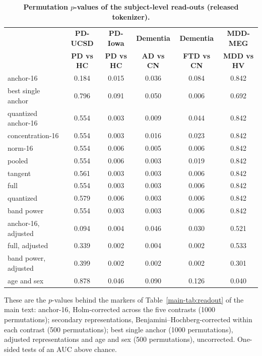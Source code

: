\begin{table}[!ht]
\renewcommand{\baselinestretch}{1}
\caption{{\bf Permutation $p$-values of the subject-level read-outs (released tokenizer).}}
\label{tab:readout-p}
\centering\footnotesize
\setlength{\tabcolsep}{4pt}
\begin{tabular}{lccccc}
\toprule
& \textbf{PD-UCSD} & \textbf{PD-Iowa} & \textbf{Dementia} & \textbf{Dementia} & \textbf{MDD-MEG} \\
& \textbf{PD vs HC} & \textbf{PD vs HC} & \textbf{AD vs CN} & \textbf{FTD vs CN} & \textbf{MDD vs HV} \\
\midrule
anchor-16 & 0.184 & 0.015 & 0.036 & 0.084 & 0.842 \\
best single anchor & 0.796 & 0.091 & 0.050 & 0.006 & 0.692 \\
quantized anchor-16 & 0.554 & 0.003 & 0.009 & 0.044 & 0.842 \\
concentration-16 & 0.554 & 0.003 & 0.016 & 0.023 & 0.842 \\
norm-16 & 0.554 & 0.006 & 0.005 & 0.006 & 0.842 \\
pooled & 0.554 & 0.006 & 0.003 & 0.019 & 0.842 \\
tangent & 0.561 & 0.003 & 0.003 & 0.006 & 0.842 \\
full & 0.554 & 0.003 & 0.003 & 0.006 & 0.842 \\
quantized & 0.579 & 0.006 & 0.003 & 0.006 & 0.842 \\
band power & 0.554 & 0.003 & 0.003 & 0.006 & 0.842 \\
anchor-16, adjusted & 0.094 & 0.004 & 0.046 & 0.030 & 0.521 \\
full, adjusted & 0.339 & 0.002 & 0.004 & 0.002 & 0.533 \\
band power, adjusted & 0.399 & 0.002 & 0.002 & 0.002 & 0.301 \\
age and sex & 0.878 & 0.046 & 0.090 & 0.126 & 0.040 \\
\bottomrule
\end{tabular}
\begin{flushleft}\footnotesize These are the $p$-values behind the markers of Table~\ref{main-tab:readout} of the main text: anchor-16, Holm-corrected across the five contrasts (1000 permutations); secondary representations, Benjamini--Hochberg-corrected within each contrast (500 permutations); best single anchor (1000 permutations), adjusted representations and age and sex (500 permutations), uncorrected. One-sided tests of an AUC above chance.\end{flushleft}
\end{table}
